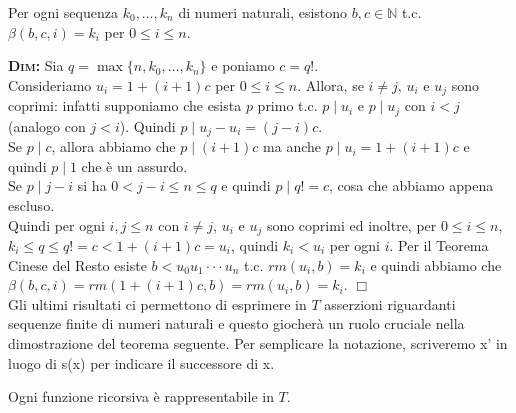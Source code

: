 \begin{lem}
Per ogni sequenza $k_{0},\ldots, k_{n}$ di numeri naturali, esistono $b, c \in \mathbb{N}$ t.c. $\beta(b,c,i)=k_{i}$ per $0\leq i \leq n$.
\end{lem}

\textsc{\textbf{Dim:}} Sia $q= \max\{n, k_{0},\ldots,k_{n}\}$ e poniamo $c=q!$. \\Consideriamo $u_{i}=1+(i+1)c$ per $0\leq i\leq n$.
Allora, se $i\neq j$, $u_{i}$ e $u_{j}$ sono coprimi: infatti supponiamo che esista $p$ primo t.c. $p\mid u_{i}$ e $p\mid u_{j}$ con $i<j$ (analogo con $j<i$). Quindi $p\mid u_{j}-u_{i}=(j-i)c$.\\
Se $p\mid c$, allora abbiamo che $p\mid (i+1)c$ ma anche $p\mid u_{i}=1+(i+1)c$ e quindi $p\mid 1$ che \`e un assurdo.\\
Se $p\mid j-i$ si ha $0<j-i\leq n\leq q$ e quindi $p\mid q!=c$, cosa che abbiamo appena escluso.\\
Quindi per ogni $i,j\leq n$ con $i\neq j$, $u_{i}$ e $u_{j}$ sono coprimi ed inoltre, per $0\leq i\leq n$, $k_{i}\leq q\leq q!= c<1+(i+1)c=u_{i}$, quindi $k_{i}<u_{i}$ per ogni $i$. Per il Teorema Cinese del Resto esiste $b<u_{0}u_{1}\cdot\cdot\cdot u_{n}$ t.c. $rm(u_{i}, b)=k_{i}$ e quindi abbiamo che $\beta(b,c,i)=rm(1+(i+1)c,b)=rm(u_{i},b)=k_{i}$.
 $\Box$\\



Gli ultimi risultati ci permettono di esprimere in $T$ asserzioni riguardanti sequenze finite di numeri naturali e questo giocher\`a un ruolo cruciale nella dimostrazione del teorema seguente. Per semplicare la notazione, scriveremo x' in luogo di s(x) per indicare il successore di x.

\begin{thm}
Ogni funzione ricorsiva \`e rappresentabile in $T$.
\end{thm}

